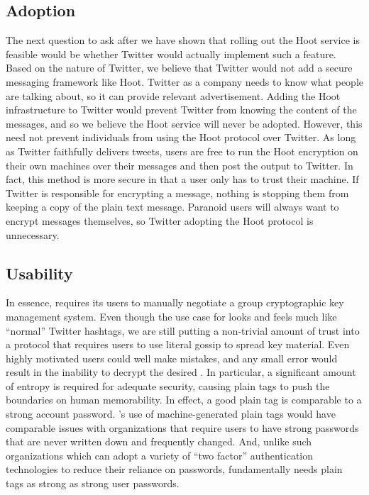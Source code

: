 \subsection{Adoption}	

The next question to ask after we have shown that rolling out the Hoot service is feasible would be whether Twitter would actually implement such a feature. Based on the nature of Twitter, we believe that Twitter would not add a secure messaging framework like Hoot. Twitter as a company needs to know what people are talking about, so it can provide relevant advertisement. Adding the Hoot infrastructure to Twitter would prevent Twitter from knowing the content of the messages, and so we believe the Hoot service will never be adopted. However, this need not prevent individuals from using the Hoot protocol over Twitter. As long as Twitter faithfully delivers tweets, users are free to run the Hoot encryption on their own machines over their messages and then post the output to Twitter. In fact, this method is more secure in that a user only has to trust their machine. If Twitter is responsible for encrypting a message, nothing is stopping them from keeping a copy of the plain text message. Paranoid users will always want to encrypt messages themselves, so Twitter adopting the Hoot protocol is unnecessary.
\fi
		
\subsection{Usability}

In essence, \hoot requires its users to manually negotiate a group cryptographic key management system. Even though the use case for \hoot looks and feels much like ``normal'' Twitter hashtags, we are still putting a non-trivial amount of trust into a protocol that requires users to use literal gossip to spread key material. Even highly motivated users could well make mistakes, and any small error would result in the inability to decrypt the desired \msgs. In particular, a significant amount of entropy is required for adequate security, causing \hoot plain tags to push the boundaries on human memorability. In effect, a good \hoot plain tag is comparable to a strong account password. \hoot's use of machine-generated plain tags would have comparable issues with organizations that require users to have strong passwords that are never written down and frequently changed.  And, unlike such organizations which can adopt a variety of ``two factor'' authentication technologies to reduce their reliance on passwords, \hoot fundamentally needs plain tags as strong as strong user passwords.

